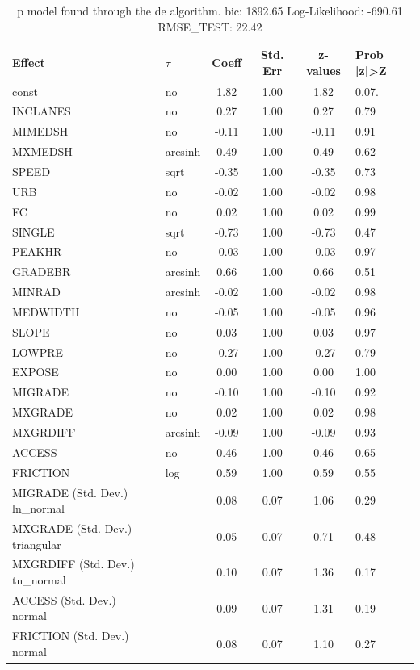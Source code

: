 \begin{table}
	\caption{p model found through the de algorithm. bic: 1892.65 Log-Likelihood: -690.61 RMSE_TEST: 22.42}
	\begin{center}
		\begin{tabular}{|l|l|c|c|c|l|}
			\hline
			Effect & $\tau$ & Coeff & Std. Err & z-values & Prob |z|>Z \\
			\hline
			const & no & 1.82 & 1.00 & 1.82 & 0.07. \\
			\hline
			INCLANES & no & 0.27 & 1.00 & 0.27 & 0.79 \\
			\hline
			MIMEDSH & no & -0.11 & 1.00 & -0.11 & 0.91 \\
			\hline
			MXMEDSH & arcsinh & 0.49 & 1.00 & 0.49 & 0.62 \\
			\hline
			SPEED & sqrt & -0.35 & 1.00 & -0.35 & 0.73 \\
			\hline
			URB & no & -0.02 & 1.00 & -0.02 & 0.98 \\
			\hline
			FC & no & 0.02 & 1.00 & 0.02 & 0.99 \\
			\hline
			SINGLE & sqrt & -0.73 & 1.00 & -0.73 & 0.47 \\
			\hline
			PEAKHR & no & -0.03 & 1.00 & -0.03 & 0.97 \\
			\hline
			GRADEBR & arcsinh & 0.66 & 1.00 & 0.66 & 0.51 \\
			\hline
			MINRAD & arcsinh & -0.02 & 1.00 & -0.02 & 0.98 \\
			\hline
			MEDWIDTH & no & -0.05 & 1.00 & -0.05 & 0.96 \\
			\hline
			SLOPE & no & 0.03 & 1.00 & 0.03 & 0.97 \\
			\hline
			LOWPRE & no & -0.27 & 1.00 & -0.27 & 0.79 \\
			\hline
			EXPOSE & no & 0.00 & 1.00 & 0.00 & 1.00 \\
			\hline
			MIGRADE & no & -0.10 & 1.00 & -0.10 & 0.92 \\
			\hline
			MXGRADE & no & 0.02 & 1.00 & 0.02 & 0.98 \\
			\hline
			MXGRDIFF & arcsinh & -0.09 & 1.00 & -0.09 & 0.93 \\
			\hline
			ACCESS & no & 0.46 & 1.00 & 0.46 & 0.65 \\
			\hline
			FRICTION & log & 0.59 & 1.00 & 0.59 & 0.55 \\
			\hline
			MIGRADE (Std. Dev.) ln_normal &  & 0.08 & 0.07 & 1.06 & 0.29 \\
			\hline
			MXGRADE (Std. Dev.) triangular &  & 0.05 & 0.07 & 0.71 & 0.48 \\
			\hline
			MXGRDIFF (Std. Dev.) tn_normal &  & 0.10 & 0.07 & 1.36 & 0.17 \\
			\hline
			ACCESS (Std. Dev.) normal &  & 0.09 & 0.07 & 1.31 & 0.19 \\
			\hline
			FRICTION (Std. Dev.) normal &  & 0.08 & 0.07 & 1.10 & 0.27 \\
			\hline
		\end{tabular}
	\end{center}
\end{table}
